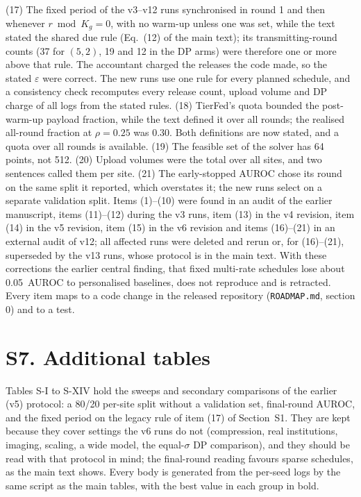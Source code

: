 \documentclass[journal]{IEEEtran}
\newcommand{\tierfed}{TierFed}
\begin{document}
(17) The fixed period of the v3--v12 runs synchronised in round 1 and then whenever $r\bmod K_g=0$, with no warm-up unless one was set, while the text stated the shared due rule (Eq.~(12) of the main text); its transmitting-round counts (37 for $(5,2)$, 19 and 12 in the DP arms) were therefore one or more above that rule. The accountant charged the releases the code made, so the stated $\varepsilon$ were correct. The new runs use one rule for every planned schedule, and a consistency check recomputes every release count, upload volume and DP charge of all logs from the stated rules. (18) \tierfed{}'s quota bounded the post-warm-up payload fraction, while the text defined it over all rounds; the realised all-round fraction at $\rho=0.25$ was 0.30. Both definitions are now stated, and a quota over all rounds is available. (19) The feasible set of the solver has 64 points, not 512. (20) Upload volumes were the total over all sites, and two sentences called them per site. (21) The early-stopped AUROC chose its round on the same split it reported, which overstates it; the new runs select on a separate validation split. Items (1)--(10) were found in an audit of the earlier manuscript, items (11)--(12) during the v3 runs, item (13) in the v4 revision, item (14) in the v5 revision, item (15) in the v6 revision and items (16)--(21) in an external audit of v12; all affected runs were deleted and rerun or, for (16)--(21), superseded by the v13 runs, whose protocol is in the main text. With these corrections the earlier central finding, that fixed multi-rate schedules lose about 0.05~AUROC to personalised baselines, does not reproduce and is retracted. Every item maps to a code change in the released repository (\texttt{ROADMAP.md}, section 0) and to a test.


\section{S7. Additional tables}
Tables S-I to S-XIV hold the sweeps and secondary comparisons of the earlier (v5) protocol: a 80/20 per-site split without a validation set, final-round AUROC, and the fixed period on the legacy rule of item (17) of Section~S1. They are kept because they cover settings the v6 runs do not (compression, real institutions, imaging, scaling, a wide model, the equal-$\sigma$ DP comparison), and they should be read with that protocol in mind; the final-round reading favours sparse schedules, as the main text shows. Every body is generated from the per-seed logs by the same script as the main tables, with the best value in each group in bold.
\end{document}
